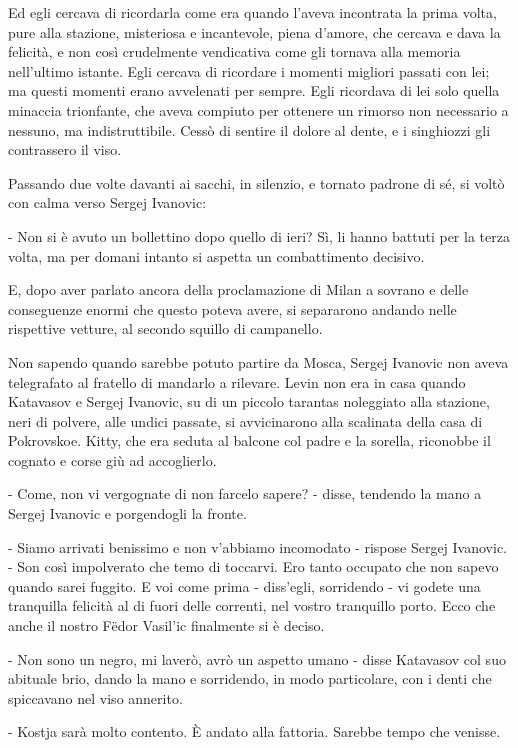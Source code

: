 Ed egli cercava di ricordarla come era quando l'aveva incontrata la prima volta, pure alla stazione, misteriosa e incantevole, piena d'amore, che cercava e dava la felicità, e non così crudelmente vendicativa come gli tornava alla memoria nell'ultimo istante. Egli cercava di ricordare i momenti migliori passati con lei; ma questi momenti erano avvelenati per sempre. Egli ricordava di lei solo quella minaccia trionfante, che aveva compiuto per ottenere un rimorso non necessario a nessuno, ma indistruttibile. Cessò di sentire il dolore al dente, e i singhiozzi gli contrassero il viso. 

Passando due volte davanti ai sacchi, in silenzio, e tornato padrone di sé, si voltò con calma verso Sergej Ivanovic: 

- Non si è avuto un bollettino dopo quello di ieri? Sì, li hanno battuti per la terza volta, ma per domani intanto si aspetta un combattimento decisivo. 

E, dopo aver parlato ancora della proclamazione di Milan a sovrano e delle conseguenze enormi che questo poteva avere, si separarono andando nelle rispettive vetture, al secondo squillo di campanello. 

\label{vi-7} 

Non sapendo quando sarebbe potuto partire da Mosca, Sergej Ivanovic non aveva telegrafato al fratello di mandarlo a rilevare. Levin non era in casa quando Katavasov e Sergej Ivanovic, su di un piccolo tarantas noleggiato alla stazione, neri di polvere, alle undici passate, si avvicinarono alla scalinata della casa di Pokrovskoe. Kitty, che era seduta al balcone col padre e la sorella, riconobbe il cognato e corse giù ad accoglierlo. 

- Come, non vi vergognate di non farcelo sapere? - disse, tendendo la mano a Sergej Ivanovic e porgendogli la fronte. 

- Siamo arrivati benissimo e non v'abbiamo incomodato - rispose Sergej Ivanovic. - Son così impolverato che temo di toccarvi. Ero tanto occupato che non sapevo quando sarei fuggito. E voi come prima - diss'egli, sorridendo - vi godete una tranquilla felicità al di fuori delle correnti, nel vostro tranquillo porto. Ecco che anche il nostro Fëdor Vasil'ic finalmente si è deciso. 

- Non sono un negro, mi laverò, avrò un aspetto umano - disse Katavasov col suo abituale brio, dando la mano e sorridendo, in modo particolare, con i denti che spiccavano nel viso annerito. 

- Kostja sarà molto contento. È andato alla fattoria. Sarebbe tempo che venisse. 

